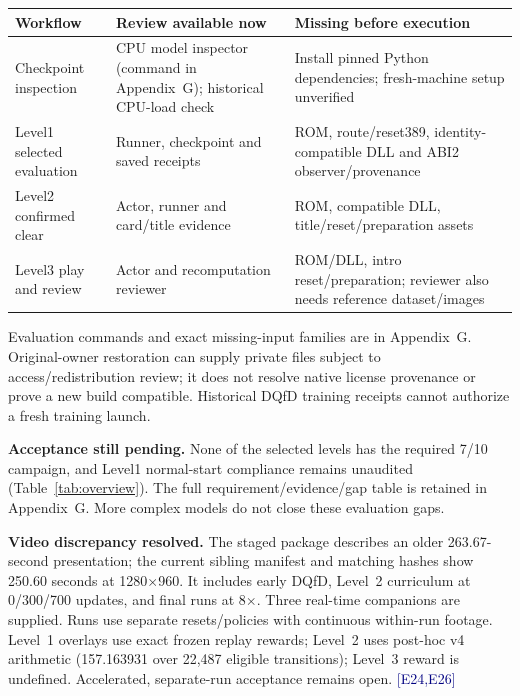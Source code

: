\documentclass[11pt,a4paper]{article}
\newcommand{\ev}[1]{{\small\textcolor{navy}{[#1]}}}
\begin{document}
\begin{tabularx}{\linewidth}{@{}P{31mm}Y P{49mm}@{}}\toprule
Workflow & Review available now & Missing before execution\\\midrule
Checkpoint inspection & CPU model inspector (command in Appendix~G); historical CPU-load check & Install pinned Python dependencies; fresh-machine setup unverified\\
Level1 selected evaluation & Runner, checkpoint and saved receipts & ROM, route/reset389, identity-compatible DLL and ABI2 observer/provenance\\
Level2 confirmed clear & Actor, runner and card/title evidence & ROM, compatible DLL, title/reset/preparation assets\\
Level3 play and review & Actor and recomputation reviewer & ROM/DLL, intro reset/preparation; reviewer also needs reference dataset/images\\\bottomrule
\end{tabularx}
Evaluation commands and exact missing-input families are in Appendix~G. Original-owner restoration can supply private files subject to access/redistribution review; it does not resolve native license provenance or prove a new build compatible. Historical DQfD training receipts cannot authorize a fresh training launch.

\textbf{Acceptance still pending.} None of the selected levels has the required 7/10 campaign, and Level1 normal-start compliance remains unaudited (Table~\ref{tab:overview}). The full requirement/evidence/gap table is retained in Appendix~G. More complex models do not close these evaluation gaps.

\textbf{Video discrepancy resolved.} The staged package describes an older 263.67-second presentation; the current sibling manifest and matching hashes show 250.60 seconds at 1280$\times$960. It includes early DQfD, Level~2 curriculum at 0/300/700 updates, and final runs at 8$\times$. Three real-time companions are supplied. Runs use separate resets/policies with continuous within-run footage. Level~1 overlays use exact frozen replay rewards; Level~2 uses post-hoc v4 arithmetic (157.163931 over 22,487 eligible transitions); Level~3 reward is undefined. Accelerated, separate-run acceptance remains open. \ev{E24,E26}
\end{document}
